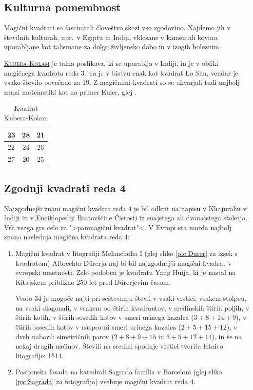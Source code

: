 \documentclass[a4paper,12pt]{article}
\newcommand{\pojem}[1]{\underline{\textsc{#1}}}
\theoremstyle{definition}
\theoremstyle{plain}
\newenvironment{magic}[3]{
   \begin{table}[!ht]%
   \centering%
   \caption{#2}%
   \label{#3}%
   \large
   \begin{tabular}{|*{#1}{c|}}%
      \hline
}{
   \end{tabular}%
   \end{table}%
}
\begin{document}
\subsection{Kulturna pomembnost}

Magični kvadrati so fascinirali človeštvo skozi vso zgodovino. Najdemo jih
v številnih kulturah, npr.\ v Egiptu in Indiji, vklesane v kamen ali
kovino, uporabljane kot talismane za dolgo življensko dobo in v
izogib boleznim.

\pojem{Kubera-Kolam} je talna poslikava, ki se uporablja v Indiji, in je v
obliki magičnega kvadrata reda 3. Ta je v bistvu enak kot kvadrat
Lo Shu, vendar je vsako število povečano za 19.
Z magičnimi kvadrati so se ukvarjali tudi najbolj znani matematiki kot na
primer Euler, glej \cite{euler}.

\begin{magic}{3}{Kvadrat Kubera-Kolam}{tab:Kubera}
   23 & 28 & 21 \\\hline
   22 & 24 & 26 \\\hline
   27 & 20 & 25 \\\hline
\end{magic}

\subsection{Zgodnji kvadrati reda 4}

Najzgodnejši znani magični kvadrat reda 4 je bil odkrit na napisu
v Khajurahu v Indiji in v Enciklopediji Bratovščine Čistosti iz enajstega
ali dvanajstega stoletja. Vrh vsega gre celo za ">panmagični kvadrat"<.
V Evropi sta morda najbolj znana naslednja magična kvadrata reda 4:
\begin{enumerate}
   \item
   Magični kvadrat v litografiji Melancholia I (glej sliko \ref{pic:Durer}
   za izsek s kvadratom) Albrechta Dürerja naj bi bil najzgodnejši magični kvadrat
   v evropski umetnosti. Zelo podoben je kvadratu Yang Huija, ki je nastal na Kitajskem
   približno 250 let pred Dürerjevim časom.

   Vsoto 34 je mogoče najti pri seštevanju števil v vsaki vrstici, vsakem stolpcu,
   na vsaki diagonali, v vsakem od štirih kvadrantov, v sredinskih štirih poljih,
   v štirih kotih, v štirih sosedih kotov v smeri urinega kazalca ($3 + 8 + 14 + 9$), v
   štirih sosedih kotov v nasprotni smeri urinega kazalca ($2 + 5 + 15 + 12$), v dveh naborih
   simetričnih parov ($2 + 8 + 9 + 15$ in $3 + 5 + 12 + 14$), in še na nekaj drugih načinov.
   Števili na sredini spodnje vrstici tvorita letnico litografije: 1514.
   \item
   Pasijonska fasada na katedrali Sagrada família v Barceloni
   (glej sliko \ref{pic:Sagrada} za fotografijo) vsebuje magični kvadrat reda 4.
\end{enumerate}
\end{document}
